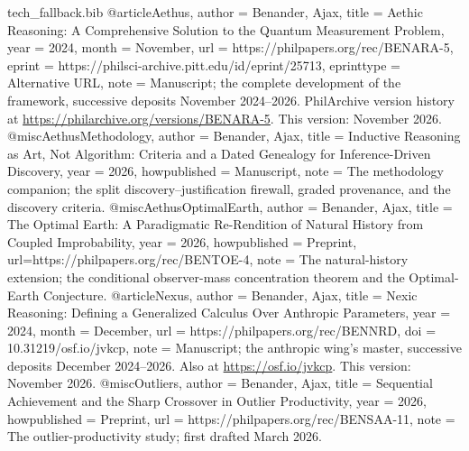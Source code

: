 \begin{filecontents}[overwrite]{tech_fallback.bib}
@article{Aethus,
  author      = {Benander, Ajax},
  title       = {Aethic Reasoning: A Comprehensive Solution to the Quantum Measurement Problem},
  year        = {2024},
  month       = {November},
  url         = {https://philpapers.org/rec/BENARA-5},
  eprint      = {https://philsci-archive.pitt.edu/id/eprint/25713},
  eprinttype  = {Alternative URL},
  note        = {Manuscript; the complete development of the framework, successive
                 deposits November 2024--2026. PhilArchive version history at
                 \url{https://philarchive.org/versions/BENARA-5}. This version: November 2026.}
}
@misc{AethusMethodology,
  author       = {Benander, Ajax},
  title        = {Inductive Reasoning as Art, Not Algorithm: Criteria and a Dated Genealogy for Inference-Driven Discovery},
  year         = {2026},
  howpublished = {Manuscript},
  note         = {The methodology companion; the split discovery--justification
                  firewall, graded provenance, and the discovery criteria.}
}
@misc{AethusOptimalEarth,
  author       = {Benander, Ajax},
  title        = {The Optimal Earth: A Paradigmatic Re-Rendition of Natural History from Coupled Improbability},
  year         = {2026},
  howpublished = {Preprint},
  url={https://philpapers.org/rec/BENTOE-4},
  note         = {The natural-history extension; the conditional observer-mass
                  concentration theorem and the Optimal-Earth Conjecture.}
}
@article{Nexus,
  author      = {Benander, Ajax},
  title       = {Nexic Reasoning: Defining a Generalized Calculus Over Anthropic Parameters},
  year        = {2024},
  month       = {December},
  url         = {https://philpapers.org/rec/BENNRD},
  doi         = {10.31219/osf.io/jvkcp},
  note        = {Manuscript; the anthropic wing's master, successive deposits
                 December 2024--2026. Also at \url{https://osf.io/jvkcp}.
                 This version: November 2026.}
}
@misc{Outliers,
  author       = {Benander, Ajax},
  title        = {Sequential Achievement and the Sharp Crossover in Outlier Productivity},
  year         = {2026},
  howpublished = {Preprint},
  url          = {https://philpapers.org/rec/BENSAA-11},
  note         = {The outlier-productivity study; first drafted March 2026.}
}


\end{filecontents}
